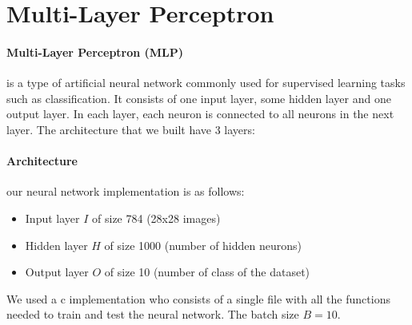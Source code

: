 \documentclass[11pt]{article}
\begin{document}

\maketitle %

\thispagestyle{empty} %

\newpage


\section{Multi-Layer Perceptron}

\paragraph*{Multi-Layer Perceptron (MLP)}is a type of artificial neural network commonly used for supervised learning tasks such as classification.
It consists of one input layer, some hidden layer and one output layer. In each layer, each neuron is connected to all neurons in the next layer.
The architecture that we built have 3 layers:

\paragraph*{Architecture} our neural network implementation is as follows:

\begin{itemize}
	\item Input layer $I$ of size 784 (28x28 images)
	\item Hidden layer $H$ of size 1000 (number of hidden neurons)
	\item Output layer $O$ of size 10 (number of class of the dataset)
\end{itemize}

We used a c implementation who consists of a single file with all the functions needed to train and test the neural network. The batch size $B=10$.
\end{document}
